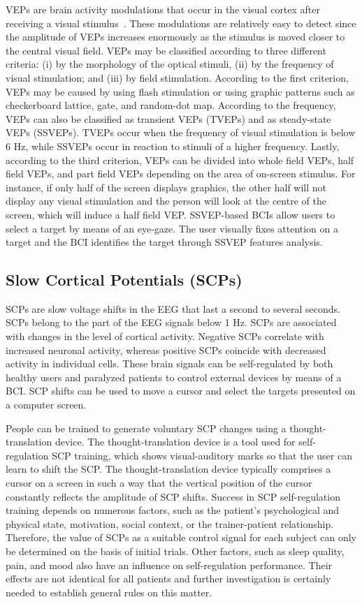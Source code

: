 VEPs are brain activity modulations that occur in the visual cortex after receiving a visual stimulus~\cite{7}. These modulations are relatively easy to detect since the amplitude of VEPs increases enormously as the stimulus is moved closer to the central visual field. VEPs may be classified according to three different criteria: (i) by the morphology of the optical stimuli, (ii) by the frequency of visual stimulation; and (iii) by field stimulation. According to the first criterion, VEPs may be caused by using flash stimulation or using graphic patterns such as checkerboard lattice, gate, and random-dot map. According to the frequency, VEPs can also be classified as transient VEPs (TVEPs) and as steady-state VEPs (SSVEPs). TVEPs occur when the frequency of visual stimulation is below 6 Hz, while SSVEPs occur in reaction to stimuli of a higher frequency. Lastly, according to the third criterion, VEPs can be divided into whole field VEPs, half field VEPs, and part field VEPs depending on the area of on-screen stimulus. For instance, if only half of the screen displays graphics, the other half will not display any visual stimulation and the person will look at the centre of the screen, which will induce a half  field VEP. SSVEP-based BCIs allow users to select a target by means of an eye-gaze. The user visually fixes attention on a target and the BCI identifies the target through SSVEP features analysis.

\subsection{Slow Cortical Potentials (SCPs)}\label{ch2:5}

SCPs are slow voltage shifts in the EEG that last a second to several seconds. SCPs belong to the part of the EEG signals below 1 Hz. SCPs are associated with changes in the level of cortical activity. Negative SCPs correlate with increased neuronal activity, whereas positive SCPs coincide with decreased activity in individual cells. These brain signals can be self-regulated by both healthy users and paralyzed patients to control external devices by means of a BCI. SCP shifts can be used to move a cursor and select the targets presented on a computer screen.

People can be trained to generate voluntary SCP changes using a thought-translation device. The thought-translation device is a tool used for self-regulation SCP training, which shows visual-auditory marks so that the user can learn to shift the SCP. The thought-translation device typically comprises a cursor on a screen in such a way that the vertical position of the cursor constantly reflects the amplitude of SCP shifts. Success in SCP self-regulation training depends on numerous factors, such as the patient's psychological and physical state, motivation, social context, or the trainer-patient relationship. Therefore, the value of SCPs as a suitable control signal for each subject can only be determined on the basis of initial trials. Other factors, such as sleep quality, pain, and mood also have an influence on self-regulation performance. Their effects are not identical for all patients and further investigation is certainly needed to establish general rules on this matter.

